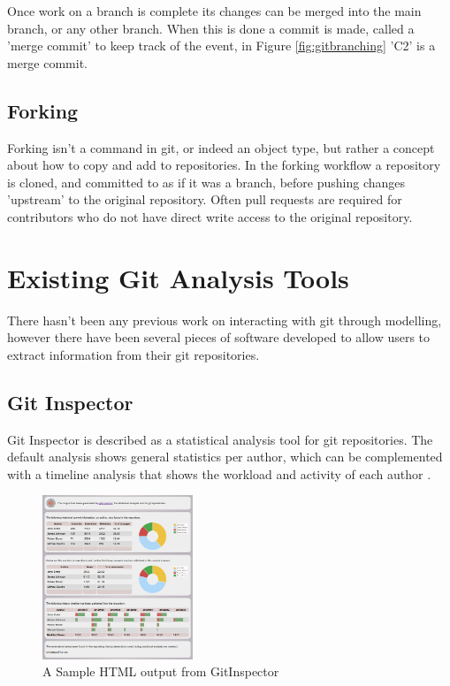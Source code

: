 \documentclass[11pt]{book}
\begin{document}
Once work on a branch is complete its changes can be merged into the main branch, or any other branch. When this is done a commit is made, called a 'merge commit' to keep track of the event, in Figure \ref{fig:gitbranching} 'C2' is a merge commit.

\subsection{Forking}
Forking isn't a command in git, or indeed an object type, but rather a concept about how to copy and add to repositories. In the forking workflow \cite{gitcomparingworkflows} a repository is cloned, and committed to as if it was a branch, before pushing changes 'upstream' to the original repository. Often pull requests are required for contributors who do not have direct write access to the original repository.

\section{Existing Git Analysis Tools}
\label{competitors}
There hasn't been any previous work on interacting with git through modelling, however there have been several pieces of software developed to allow users to extract information from their git repositories.

\subsection{Git Inspector}
Git Inspector is described as a statistical analysis tool for git repositories. The default analysis shows general statistics per author, which can be complemented with a timeline analysis that shows the workload and activity of each author \cite{gitinspector}.

\begin{figure}[h]
	\centering
	\includegraphics[width=0.4\textwidth]{images/gitinspector}
	\caption{A Sample HTML output from GitInspector \cite{gitinspector}}
	\label{fig:gitinspector}
\end{figure} 
\end{document}
